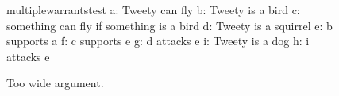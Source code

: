 \documentclass[a4paper]{article}
\begin{document}
\begin{figure}[h]
	\centering
	\begin{haslpicture}[scale=0.5]{multiplewarrantstest}
		a: Tweety can fly
		b: Tweety is a bird
		c: something can fly if something is a bird
		d: Tweety is a squirrel
		e: b supports a
		f: c supports e
		g: d attacks e
		i: Tweety is a dog
		h: i attacks e
	\end{haslpicture}
	\caption{Too wide argument.}
	\label{fig:hasl1evalconjunctiontort}
\end{figure}
\end{document}
